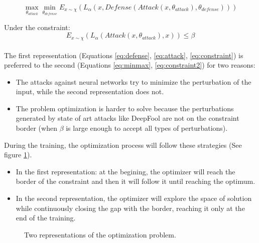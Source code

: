 \documentclass[12pt]{article}
\begin{document}
\begin{equation}\label{eq:minmax}
\max_{\theta_{attack}} \min_{\theta_{defense}} E_{x \sim \chi}(L_{\alpha}(x, Defense(Attack(x, \theta_{attack}), \theta_{defense})))
\end{equation}

Under the constraint:
\begin{equation}\label{eq:constraint2}
E_{x \sim \chi}(L_{\alpha}(Attack(x, \theta_{attack}), x)) \leq \beta
\end{equation}

\paragraph{}
The first representation (Equations \ref{eq:defense}, \ref{eq:attack}, \ref{eq:constraint}) is preferred to the second (Equations \ref{eq:minmax}, \ref{eq:constraint2}) for two reasons:
\begin{itemize}
\item The attacks against neural networks try to minimize the perturbation of the input, while the second representation does not. 
\item The problem optimization is harder to solve because the perturbations generated by state of art attacks like DeepFool \cite{moosavi-dezfooli_deepfool:_2015} are not on the constraint border (when $\beta$ is large enough to accept all types of perturbations).
\end{itemize}

During the training, the optimization process will follow these strategies (See figure \ref{repr}).
\begin{itemize}
\item In the first representation: at the begining, the optimizer will reach the border of the constraint and then it will follow it until reaching the optimum.
\item In the second representation, the optimizer will explore the space of solution while continuously closing the gap with the border, reaching it only at the end of the training.
\end{itemize}

\begin{figure}[H]
\centering
{}
\caption{Two representations of the optimization problem.}
\label{repr}
\end{figure}
\end{document}
